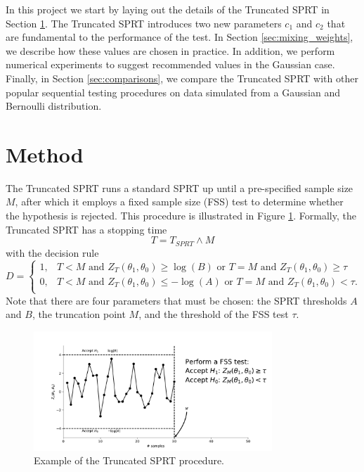 \documentclass[11pt]{article}
\begin{document}
In this project we start by laying out the details of the Truncated SPRT in Section \ref{sec:method}. The Truncated SPRT introduces two new parameters $c_1$ and $c_2$ that are fundamental to the performance of the test. In Section \ref{sec:mixing_weights}, we describe how these values are chosen in practice. In addition, we perform numerical experiments to suggest recommended values in the Gaussian case. Finally, in Section \ref{sec:comparisons}, we compare the Truncated SPRT with other popular sequential testing procedures on data simulated from a Gaussian and Bernoulli distribution.

\section{Method}\label{sec:method}

The Truncated SPRT runs a standard SPRT up until a pre-specified sample size $M$, after which it employs a fixed sample size (FSS) test to determine whether the hypothesis is rejected. This procedure is illustrated in Figure \ref{fig:trunc_sprt}.  Formally, the Truncated SPRT has a stopping time
\begin{equation}
T = T_{SPRT} \wedge M
\end{equation}
with the decision rule
\begin{equation}
D =
\begin{cases}
1, & T < M \text{ and } Z_T(\theta_1, \theta_0) \geq \log(B) \text{ or } T = M \text{ and } Z_T(\theta_1, \theta_0) \geq \tau \\
0, & T < M \text{ and } Z_T(\theta_1, \theta_0) \leq -\log(A) \text{ or } T = M \text{ and } Z_T(\theta_1, \theta_0) < \tau. \\
\end{cases}
\end{equation}
Note that there are four parameters that must be chosen: the SPRT thresholds $A$ and $B$, the truncation point $M$, and the threshold of the FSS test $\tau$.
\begin{figure}
\centering
\includegraphics[width=0.8\textwidth]{images/truncated_sprt}
\caption{Example of the Truncated SPRT procedure.}
\label{fig:trunc_sprt}
\end{figure}
\end{document}
